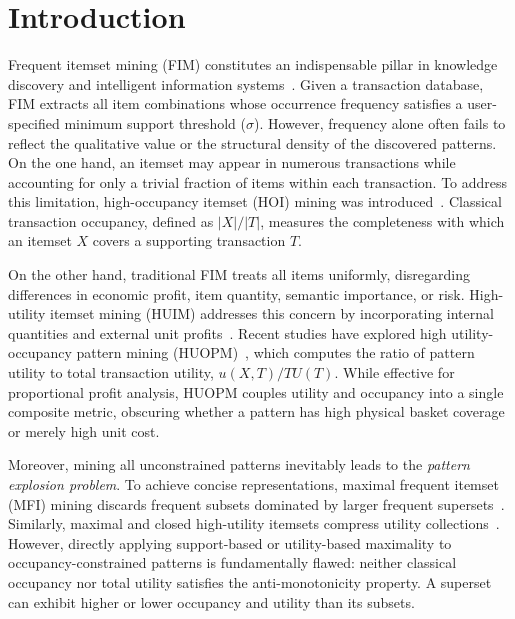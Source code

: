 \documentclass[runningheads]{llncs}
\begin{document}
\section{Introduction}
\label{sec:intro}

Frequent itemset mining (FIM) constitutes an indispensable pillar in knowledge discovery and intelligent information systems~\cite{agrawal1994fast,han2000mining,zaki2000scalable,uno2004lcm}. Given a transaction database, FIM extracts all item combinations whose occurrence frequency satisfies a user-specified minimum support threshold ($\sigma$). However, frequency alone often fails to reflect the qualitative value or the structural density of the discovered patterns. On the one hand, an itemset may appear in numerous transactions while accounting for only a trivial fraction of items within each transaction. To address this limitation, high-occupancy itemset (HOI) mining was introduced~\cite{tang2012incorporating,zhang2015occupancy,deng2020mining,datta2022high,nguyen2023efficient,yun2021mining}. Classical transaction occupancy, defined as $|X|/|T|$, measures the completeness with which an itemset $X$ covers a supporting transaction $T$.

On the other hand, traditional FIM treats all items uniformly, disregarding differences in economic profit, item quantity, semantic importance, or risk. High-utility itemset mining (HUIM) addresses this concern by incorporating internal quantities and external unit profits~\cite{liu2005two,liu2012mining,fournier2014fhm,zida2017efim,gan2021survey,wu2022ubp,lin2010effective,song2014mining,krishnamoorthy2015pruning,dam2019efficient,truong2019novel,pham2020mining,yun2017high,gan2019fast,vo2013new}. Recent studies have explored high utility-occupancy pattern mining (HUOPM)~\cite{gan2020huopm,chen2021discovering,duong2024efficient,lin2021efficient}, which computes the ratio of pattern utility to total transaction utility, $u(X, T)/TU(T)$. While effective for proportional profit analysis, HUOPM couples utility and occupancy into a single composite metric, obscuring whether a pattern has high physical basket coverage or merely high unit cost.

Moreover, mining all unconstrained patterns inevitably leads to the \emph{pattern explosion problem}. To achieve concise representations, maximal frequent itemset (MFI) mining discards frequent subsets dominated by larger frequent supersets~\cite{burdick2001mafia,gouda2005genmax,grahne2005fast}. Similarly, maximal and closed high-utility itemsets compress utility collections~\cite{tseng2014efficient,duong2022efficient,fournier2016efimclosed,shie2012efficient,tseng2016efficient}. However, directly applying support-based or utility-based maximality to occupancy-constrained patterns is fundamentally flawed: neither classical occupancy nor total utility satisfies the anti-monotonicity property. A superset can exhibit higher or lower occupancy and utility than its subsets.
\end{document}
